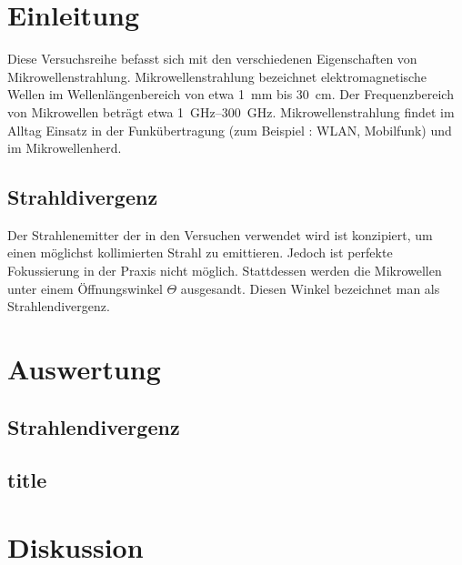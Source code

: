 \section{Einleitung}
Diese Versuchsreihe befasst sich mit den verschiedenen Eigenschaften von Mikrowellenstrahlung. Mikrowellenstrahlung bezeichnet elektromagnetische Wellen im Wellenlängenbereich von etwa \SI{1}{\milli\meter} bis \SI{30}{\centi\meter}. Der Frequenzbereich von Mikrowellen beträgt etwa \SIrange{1}{300}{\giga\hertz}. Mikrowellenstrahlung findet im Alltag Einsatz in der Funkübertragung (zum Beispiel : WLAN, Mobilfunk) und im Mikrowellenherd.
\subsection{Strahldivergenz}
Der Strahlenemitter der in den Versuchen verwendet wird ist konzipiert, um einen möglichst kollimierten Strahl zu emittieren. Jedoch ist perfekte Fokussierung in der Praxis nicht möglich. Stattdessen werden die Mikrowellen unter einem Öffnungswinkel $ \Theta $ ausgesandt. Diesen Winkel bezeichnet man als Strahlendivergenz.
\newpage
\section{Auswertung}

\subsection{Strahlendivergenz}

\subsection{title}
\newpage
\section{Diskussion} 
